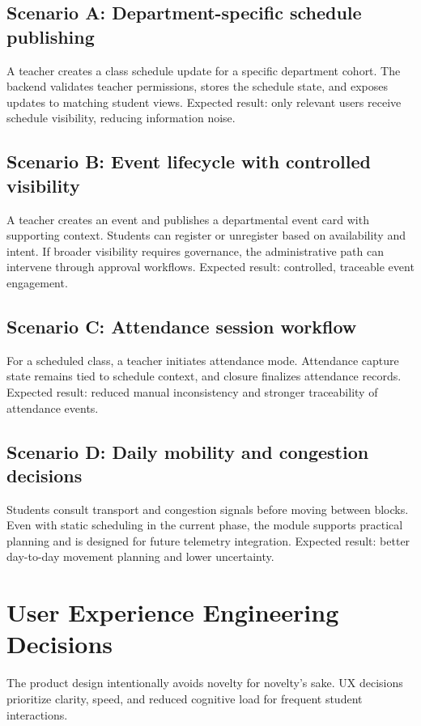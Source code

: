 \documentclass[conference]{IEEEtran}
\begin{document}
\subsection{Scenario A: Department-specific schedule publishing}
A teacher creates a class schedule update for a specific department cohort. The backend validates teacher permissions, stores the schedule state, and exposes updates to matching student views. Expected result: only relevant users receive schedule visibility, reducing information noise.

\subsection{Scenario B: Event lifecycle with controlled visibility}
A teacher creates an event and publishes a departmental event card with supporting context. Students can register or unregister based on availability and intent. If broader visibility requires governance, the administrative path can intervene through approval workflows. Expected result: controlled, traceable event engagement.

\subsection{Scenario C: Attendance session workflow}
For a scheduled class, a teacher initiates attendance mode. Attendance capture state remains tied to schedule context, and closure finalizes attendance records. Expected result: reduced manual inconsistency and stronger traceability of attendance events.

\subsection{Scenario D: Daily mobility and congestion decisions}
Students consult transport and congestion signals before moving between blocks. Even with static scheduling in the current phase, the module supports practical planning and is designed for future telemetry integration. Expected result: better day-to-day movement planning and lower uncertainty.

\section{User Experience Engineering Decisions}
The product design intentionally avoids novelty for novelty's sake. UX decisions prioritize clarity, speed, and reduced cognitive load for frequent student interactions.
\end{document}
